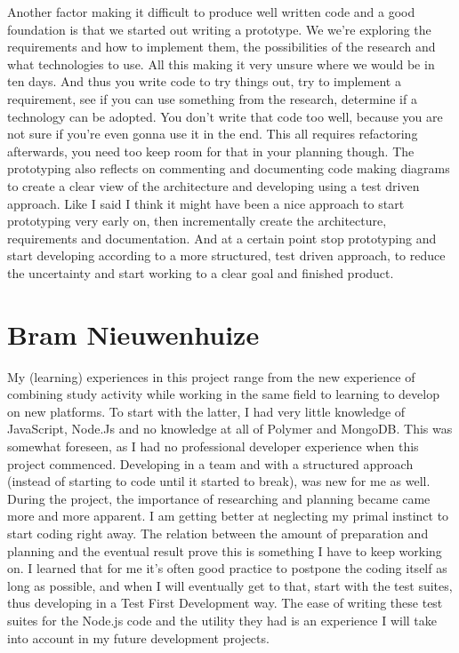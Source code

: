 Another factor making it difficult to produce well written code
and a good foundation
is that we started out writing a prototype.
We we're exploring the requirements and how to implement them,
the possibilities of the research
and what technologies to use.
All this making it very unsure where we would be in ten days.
And thus you write code to try things out,
try to implement a requirement,
see if you can use something from the research,
determine if a technology can be adopted.
You don't write that code too well,
because you are not sure if you're even gonna use it in the end.
This all requires refactoring afterwards,
you need too keep room for that in your planning though.
The prototyping also reflects on commenting and documenting code
making diagrams to create a clear view of the architecture
and developing using a test driven approach.
Like I said I think it might have been a nice approach
to start prototyping very early on,
then incrementally create the architecture, requirements and documentation.
And at a certain point stop prototyping
and start developing according to a more structured, test driven approach,
to reduce the uncertainty
and start working to a clear goal and finished product.

\section{Bram Nieuwenhuize}
My (learning) experiences in this project range from the new experience of 
combining study activity while working in the same field to learning to develop 
on new platforms.
To start with the latter, I had very little knowledge of 
JavaScript, Node.Js and no knowledge at all of Polymer and 
MongoDB. This was somewhat foreseen, as I had no 
professional developer experience when this project 
commenced. Developing in a team and with a
structured approach (instead of starting to code until it started to break),
was new for me as well. During the project, the importance of 
researching and planning became came more and more apparent. I am getting better
at neglecting my primal instinct to start coding right away. The relation 
between the amount of preparation and planning and the eventual result prove 
this is something I have to keep working on. I learned that for me it's often
good practice to postpone the coding itself as long as possible, and when I will
eventually get to that, start with the test suites, thus developing in a Test 
First Development way. The ease of writing these test suites for the Node.js
code and the utility they had is an experience I will take into account in my
future development projects.


